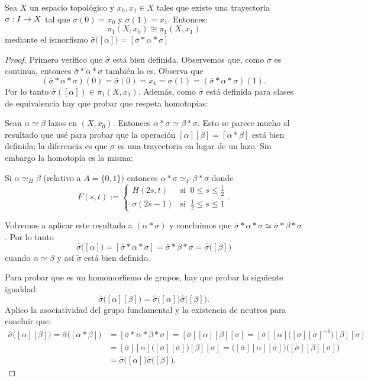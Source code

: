 
\begin{ejercicio}
Sea $X$ un espacio topol\'ogico y $x_0,x_1\in X$ tales que existe una trayectoria $\sigma:I\rightarrow X$
tal que $\sigma(0)=x_0$ y $\sigma(1)=x_1$. Entonces:
\[
	\pi_1(X,x_0) \cong \pi_1(X,x_1)
\]
mediante el ismorfismo $\hat{\sigma}\big([\alpha]\big)=[\bar{\sigma}*\alpha*\sigma]$
\end{ejercicio}

\begin{proof}%

Primero verifico que $\hat{\sigma}$ est\'a bien definida. Observemos que, como $\sigma$ es continua, 
entonces $\bar{\sigma}*\alpha*\sigma$ tambi\'en lo es. Observa que
\[
	(\bar{\sigma}*\alpha*\sigma)(0)=\bar{\sigma}(0)=x_1=\sigma(1)=(\bar{\sigma}*\alpha*\sigma)(1).
\]
Por lo tanto $\hat{\sigma}([\alpha])\in\pi_1(X,x_1)$. Adem\'as, como $\hat{\sigma}$ est\'a definida
para clases de equivalencia hay que probar que respeta homotop\'ias:

Sean $\alpha\simeq \beta$ lazos en $(X,x_0)$. Entonces $\alpha*\sigma\simeq \beta*\sigma$. Esto se
parece mucho al resultado que us\'e para probar que la operaci\'on $[\alpha][\beta]=[\alpha*\beta]$
est\'a bien definida; la diferencia es que $\sigma$ es una trayectoria en lugar de un lazo. Sin
embargo la homotop\'ia es la misma:

Si $\alpha\simeq_H\beta$ (relativo a $A=\{0,1\}$) entonces $\alpha*\sigma\simeq_F\beta*\sigma$ donde
\[
	F(s,t):=
	\begin{cases}
		H(2s,t) & \text{si}\;\; 0\leq s\leq \frac{1}{2} \\
		\sigma(2s-1) & \text{si}\;\; \frac{1}{2}\leq s\leq 1
	\end{cases}.
\]

Volvemos a aplicar este resultado a $(\alpha*\sigma)$ y concluimos que
$\bar{\sigma}*\alpha*\sigma\simeq \bar{\sigma}*\beta*\sigma$. Por lo tanto
\[
	\hat{\sigma}\big([\alpha]\big)=[\bar{\sigma}*\alpha*\sigma]=\bar{\sigma}*\beta*\sigma=
	\hat{\sigma}\big([\beta]\big)
\]
cuando $\alpha\simeq\beta$ y as\'i $\tilde{\sigma}$ est\'a bien definido.

Para probar que es un homomorfismo de grupos, hay que probar la siguiente igualdad:
\[
	\hat{\sigma}\big( [\alpha][\beta] \big)=\hat{\sigma}\big( [\alpha]\big)\hat{\sigma}\big([\beta]\big).  
\]
Aplico la asociatividad del grupo fundamental y la existencia de neutros para concluir que:
\begin{align*}%
	\hat{\sigma}\big( [\alpha][\beta] \big)=\hat{\sigma}\big( [\alpha*\beta] \big) & =%
	[\bar{\sigma}*\alpha*\beta*\sigma]=[\bar{\sigma}][\alpha][\beta][\sigma]=%
	[\bar{\sigma}][\alpha]\Big([\sigma][\sigma]^{-1} \Big)[\beta][\sigma]\\ & =%
	[\bar{\sigma}][\alpha]\Big([\sigma][\bar{\sigma}] \Big)[\beta][\sigma]=%
	\Big( [\bar{\sigma}][\alpha][\sigma] \Big) \Big( [\bar{\sigma}][\beta][\sigma] \Big) \\ & =%
	\hat{\sigma}\big( [\alpha]\big)\hat{\sigma}\big([\beta]\big).%
\end{align*}%


\end{proof}%

